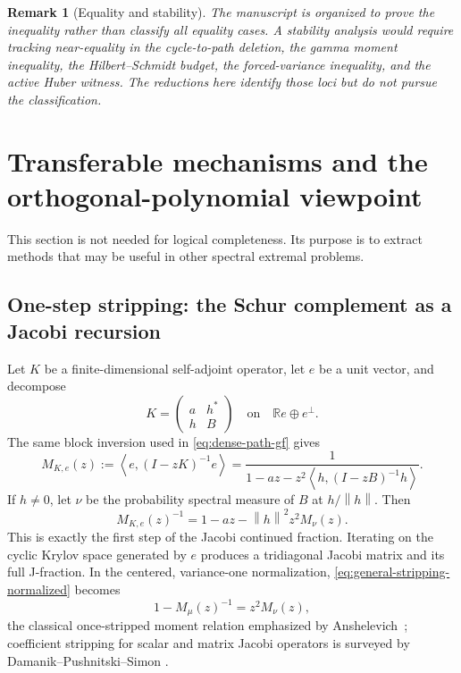 \documentclass[11pt]{article}
\newtheorem{remark}[theorem]{Remark}
\newcommand{\R}{\mathbb R}
\newcommand{\ip}[2]{\left\langle #1,#2\right\rangle}
\newcommand{\norm}[1]{\left\lVert #1\right\rVert}
\begin{document}
\begin{remark}[Equality and stability]
The manuscript is organized to prove the inequality rather than classify all
equality cases.  A stability analysis would require tracking near-equality
in the cycle-to-path deletion, the gamma moment inequality, the
Hilbert--Schmidt budget, the forced-variance inequality, and the active Huber
witness.  The reductions here identify those loci but do not pursue the
classification.
\end{remark}

\section{Transferable mechanisms and the orthogonal-polynomial viewpoint}
\label{sec:transferable}

This section is not needed for logical completeness.  Its purpose is to
extract methods that may be useful in other spectral extremal problems.

\subsection{One-step stripping: the Schur complement as a Jacobi recursion}

Let \(K\) be a finite-dimensional self-adjoint operator, let \(e\) be a unit
vector, and decompose
\[
 K=\begin{pmatrix}a&h^*\\h&B\end{pmatrix}
 \quad\text{on}\quad \R e\oplus e^\perp.
\]
The same block inversion used in \eqref{eq:dense-path-gf} gives
\begin{equation}\label{eq:general-stripping}
 M_{K,e}(z):=\ip e{(I-zK)^{-1}e}
 =\frac1{1-az-z^2\ip h{(I-zB)^{-1}h}}.
\end{equation}
If \(h\ne0\), let \(\nu\) be the probability spectral measure of \(B\) at
\(h/\norm h\).  Then
\begin{equation}\label{eq:general-stripping-normalized}
       M_{K,e}(z)^{-1}
       =1-az-\norm h^2z^2M_\nu(z).
\end{equation}
This is exactly the first step of the Jacobi continued fraction.  Iterating
on the cyclic Krylov space generated by \(e\) produces a tridiagonal Jacobi
matrix and its full J-fraction.  In the centered, variance-one normalization,
\eqref{eq:general-stripping-normalized} becomes
\[
       1-M_\mu(z)^{-1}=z^2M_\nu(z),
\]
the classical once-stripped moment relation emphasized by
Anshelevich~\cite{Anshelevich2009}; coefficient stripping for scalar and
matrix Jacobi operators is surveyed by Damanik--Pushnitski--Simon
\cite{DamanikPushnitskiSimon2008}.
\end{document}
